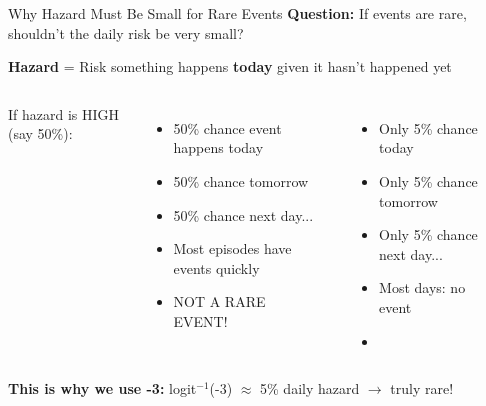 \documentclass[aspectratio=169]{beamer}
\begin{document}
\begin{frame}{Why Hazard Must Be Small for Rare Events}
\textbf{Question:} If events are rare, shouldn't the daily risk be very small?

\vspace{0.5em}

\vspace{0.5em}
\textbf{Hazard} = Risk something happens \textbf{today} given it hasn't happened yet

\begin{columns}[T]
\alert{If hazard is HIGH (say 50\%):}
\begin{itemize}
\item 50\% chance event happens today
\item 50\% chance tomorrow
\item 50\% chance next day...
\item Most episodes have events \alert{quickly}
\item \alert{NOT A RARE EVENT!}
\end{itemize}

\vspace{0.3em}
\begin{center}
\end{center}

\begin{itemize}
\item Only 5\% chance today
\item Only 5\% chance tomorrow
\item Only 5\% chance next day...
\item Most days: no event
\item {}
\end{itemize}

\vspace{0.3em}
\begin{center}
\end{center}
\end{columns}

\vspace{0.5em}
\begin{center}
\textbf{This is why we use -3:} logit$^{-1}$(-3) $\approx$ 5\% daily hazard $\to$ truly rare!
\end{center}
\end{frame}
\end{document}
